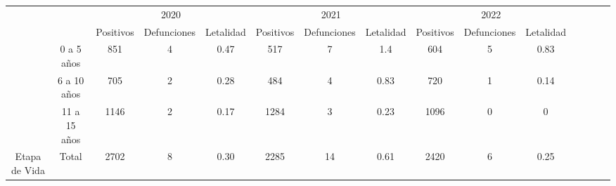 	\begin{tabular}{cc|ccc|ccc|ccc|llll}
		\cline{3-11}
		\multicolumn{1}{l}{} &
		\multicolumn{1}{l|}{} &
		\multicolumn{3}{c|}{2020} &
		\multicolumn{3}{c|}{2021} &
		\multicolumn{3}{c|}{2022} &
		&
		&
		&
		\\ \cline{3-11}
		\multicolumn{1}{l}{} &
		\multicolumn{1}{l|}{} &
		\multicolumn{1}{c|}{Positivos} &
		\multicolumn{1}{c|}{Defunciones} &
		Letalidad &
		\multicolumn{1}{c|}{Positivos} &
		\multicolumn{1}{c|}{Defunciones} &
		Letalidad &
		\multicolumn{1}{c|}{Positivos} &
		\multicolumn{1}{c|}{Defunciones} &
		Letalidad &
		&
		&
		&
		\\ \cline{2-11}
		\multicolumn{1}{c|}{} &
		0 a 5 años &
		\multicolumn{1}{c|}{851} &
		\multicolumn{1}{c|}{4} &
		0.47 &
		\multicolumn{1}{c|}{517} &
		\multicolumn{1}{c|}{7} &
		1.4 &
		\multicolumn{1}{c|}{604} &
		\multicolumn{1}{c|}{5} &
		0.83 &
		&
		&
		&
		\\ \cline{2-11}
		\multicolumn{1}{c|}{} &
		6 a 10 años &
		\multicolumn{1}{c|}{705} &
		\multicolumn{1}{c|}{2} &
		0.28 &
		\multicolumn{1}{c|}{484} &
		\multicolumn{1}{c|}{4} &
		0.83 &
		\multicolumn{1}{c|}{720} &
		\multicolumn{1}{c|}{1} &
		0.14 &
		&
		&
		&
		\\ \cline{2-11}
		\multicolumn{1}{c|}{} &
		11 a 15 años &
		\multicolumn{1}{c|}{1146} &
		\multicolumn{1}{c|}{2} &
		0.17 &
		\multicolumn{1}{c|}{1284} &
		\multicolumn{1}{c|}{3} &
		0.23 &
		\multicolumn{1}{c|}{1096} &
		\multicolumn{1}{c|}{0} &
		0 &
		&
		&
		&
		\\ \cline{2-11}
		\multicolumn{1}{c|}{\multirow{-4}{*}{Etapa de Vida}} &
		\cellcolor[HTML]{FFFFC7}Total &
		\multicolumn{1}{c|}{\cellcolor[HTML]{FFFFC7}2702} &
		\multicolumn{1}{c|}{\cellcolor[HTML]{FFFFC7}8} &
		\cellcolor[HTML]{FFFFC7}0.30 &
		\multicolumn{1}{c|}{\cellcolor[HTML]{FFFFC7}2285} &
		\multicolumn{1}{c|}{\cellcolor[HTML]{FFFFC7}14} &
		\cellcolor[HTML]{FFFFC7}0.61 &
		\multicolumn{1}{c|}{\cellcolor[HTML]{FFFFC7}2420} &
		\multicolumn{1}{c|}{\cellcolor[HTML]{FFFFC7}6} &
		\cellcolor[HTML]{FFFFC7}0.25 &
		&
		&
		&
		\\ \cline{2-11}
	\end{tabular}